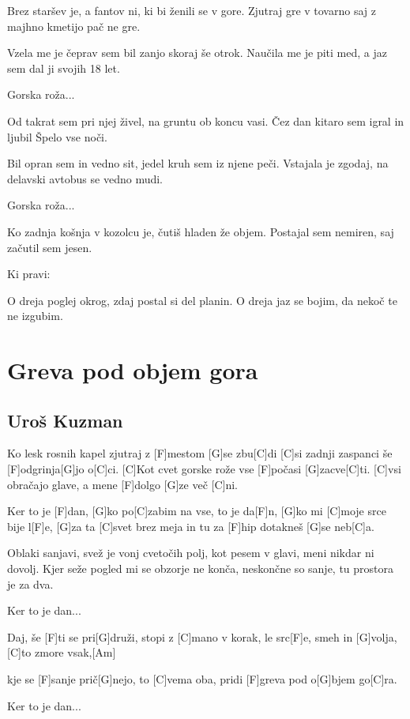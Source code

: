 \documentclass[a4paper,12pt]{article}
\begin{document}
\begin{multicols}{2}
\begin{guitar}
Brez staršev je, a fantov ni,
ki bi ženili se v gore.
Zjutraj gre v tovarno
saj z majhno kmetijo pač ne gre.


Vzela me je čeprav sem bil
zanjo skoraj še otrok.
Naučila me je piti med,
a jaz sem dal ji svojih 18 let.


Gorska roža...


Od takrat sem pri njej živel,          
na gruntu ob koncu vasi.
Čez dan kitaro sem igral 
in ljubil Špelo vse noči.


Bil opran sem in vedno sit,
jedel kruh sem iz njene peči.
Vstajala je zgodaj, na delavski
avtobus se vedno mudi.


Gorska roža...


Ko zadnja košnja v kozolcu je,
čutiš hladen že objem.
Postajal sem nemiren, 
saj začutil sem jesen. 


Ki pravi:


O dreja poglej okrog,
zdaj postal si del planin.
O dreja jaz se bojim, 
da nekoč te ne izgubim.

\end{guitar}
\section{Greva pod objem gora}
\subsection*{Uroš Kuzman}
\begin{guitar}
[C]Ko lesk rosnih kapel zjutraj z [F]mestom [G]se zbu[C]di
[C]si zadnji zaspanci še [F]odgrinja[G]jo o[C]ci. 
[C]Kot cvet gorske rože vse [F]počasi [G]zacve[C]ti. 
[C]vsi obračajo glave, a mene [F]dolgo [G]ze več [C]ni. 


Ker to je [F]dan, [G]ko po[C]zabim na vse, 
to je da[F]n, [G]ko mi [C]moje srce 
bije l[F]e, [G]za ta [C]svet brez meja 
in tu za [F]hip dotakneš [G]se neb[C]a.


Oblaki sanjavi, svež je vonj cvetočih polj, 
kot pesem v glavi, meni nikdar ni dovolj. 
Kjer seže pogled mi se obzorje ne konča, 
neskončne so sanje, tu prostora je za dva. 


Ker to je dan... 


Daj, še [F]ti se pri[G]druži, stopi z [C]mano v korak, 
le src[F]e, smeh in [G]volja, [C]to zmore vsak,[Am] 

kje se [F]sanje prič[G]nejo, to [C]vema oba, 
pridi [F]greva pod o[G]bjem go[C]ra. 


Ker to je dan... 



\end{guitar}
\end{multicols}
\end{document}
